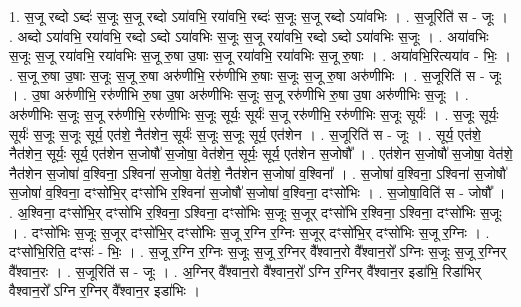 \documentclass[17pt]{extarticle}
\begin{document}
1. स॒जू रब्दो ऽब्दः॑ स॒जूः स॒जू रब्दो ऽया॑वभि॒ रया॑वभि॒ रब्दः॑ स॒जूः स॒जू रब्दो ऽया॑वभिः । . स॒जूरिति॑ स - जूः । . अब्दो ऽया॑वभि॒ रया॑वभि॒ रब्दो ऽब्दो ऽया॑वभिः स॒जूः स॒जू रया॑वभि॒ रब्दो ऽब्दो ऽया॑वभिः स॒जूः । . अया॑वभिः स॒जूः स॒जू रया॑वभि॒ रया॑वभिः स॒जू रु॒षा उ॒षाः स॒जू रया॑वभि॒ रया॑वभिः स॒जू रु॒षाः । . अया॑वभि॒रित्यया॑व - भिः॒ । . स॒जू रु॒षा उ॒षाः स॒जूः स॒जू रु॒षा अरु॑णीभि॒ ररु॑णीभि रु॒षाः स॒जूः स॒जू रु॒षा अरु॑णीभिः । . स॒जूरिति॑ स - जूः । . उ॒षा अरु॑णीभि॒ ररु॑णीभि रु॒षा उ॒षा अरु॑णीभिः स॒जूः स॒जू ररु॑णीभि रु॒षा उ॒षा अरु॑णीभिः स॒जूः । . अरु॑णीभिः स॒जूः स॒जू ररु॑णीभि॒ ररु॑णीभिः स॒जूः सूर्यः॒ सूर्यः॑ स॒जू ररु॑णीभि॒ ररु॑णीभिः स॒जूः सूर्यः॑ । . स॒जूः सूर्यः॒ सूर्यः॑ स॒जूः स॒जूः सूर्य॒ एत॑शे॒ नैत॑शेन॒ सूर्यः॑ स॒जूः स॒जूः सूर्य॒ एत॑शेन । . स॒जूरिति॑ स - जूः । . सूर्य॒ एत॑शे॒ नैत॑शेन॒ सूर्यः॒ सूर्य॒ एत॑शेन स॒जोषौ॑ स॒जोषा॒ वेत॑शेन॒ सूर्यः॒ सूर्य॒ एत॑शेन स॒जोषौ᳚ । . एत॑शेन स॒जोषौ॑ स॒जोषा॒ वेत॑शे॒ नैत॑शेन स॒जोषा॑ व॒श्विना॒ ऽश्विना॑ स॒जोषा॒ वेत॑शे॒ नैत॑शेन स॒जोषा॑ व॒श्विना᳚ । . स॒जोषा॑ व॒श्विना॒ ऽश्विना॑ स॒जोषौ॑ स॒जोषा॑ व॒श्विना॒ दꣳसो॑भि॒र् दꣳसो॑भि र॒श्विना॑ स॒जोषौ॑ स॒जोषा॑ व॒श्विना॒ दꣳसो॑भिः । . स॒जोषा॒विति॑ स - जोषौ᳚ । . अ॒श्विना॒ दꣳसो॑भि॒र् दꣳसो॑भि र॒श्विना॒ ऽश्विना॒ दꣳसो॑भिः स॒जूः स॒जूर् दꣳसो॑भि र॒श्विना॒ ऽश्विना॒ दꣳसो॑भिः स॒जूः । . दꣳसो॑भिः स॒जूः स॒जूर् दꣳसो॑भि॒र् दꣳसो॑भिः स॒जू र॒ग्नि र॒ग्निः स॒जूर् दꣳसो॑भि॒र् दꣳसो॑भिः स॒जू र॒ग्निः । . दꣳसो॑भि॒रिति॒ दꣳसः॑ - भिः॒ । . स॒जू र॒ग्नि र॒ग्निः स॒जूः स॒जू र॒ग्निर् वै᳚श्वान॒रो वै᳚श्वान॒रो᳚ ऽग्निः स॒जूः स॒जू र॒ग्निर् वै᳚श्वान॒रः । . स॒जूरिति॑ स - जूः । . अ॒ग्निर् वै᳚श्वान॒रो वै᳚श्वान॒रो᳚ ऽग्नि र॒ग्निर् वै᳚श्वान॒र इडा॑भि॒ रिडा॑भिर् वैश्वान॒रो᳚ ऽग्नि र॒ग्निर् वै᳚श्वान॒र इडा॑भिः । \newline
\end{document}
